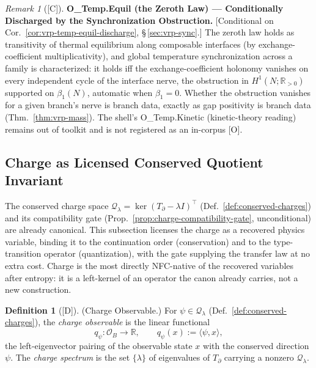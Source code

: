 \documentclass[12pt,oneside]{amsbook}
\theoremstyle{plain}
\theoremstyle{definition}
\newtheorem{definition}[theorem]{Definition}
\theoremstyle{remark}
\newtheorem{remark}[theorem]{Remark}
\newcommand{\status}[1]{\textup{[#1]}}
\begin{document}
\begin{remark}[\status{C}]\label{ob:vrp-temp-equil}
\textbf{O\_Temp.Equil (the Zeroth Law) --- Conditionally
Discharged by the Synchronization Obstruction.}
\textup{[Conditional on Cor.~\ref{cor:vrp-temp-equil-discharge},
\S\,\ref{sec:vrp-sync}.]}
The zeroth law holds as transitivity of thermal equilibrium along
composable interfaces (by exchange-coefficient multiplicativity),
and global temperature synchronization across a family is
characterized: it holds iff the exchange-coefficient holonomy
vanishes on every independent cycle of the interface nerve, the
obstruction in $H^1(N; \mathbb{R}_{>0})$ supported on
$\beta_1(N)$, automatic when $\beta_1 = 0$.  Whether the
obstruction vanishes for a given branch's nerve is branch data,
exactly as gap positivity is branch data
(Thm.~\ref{thm:vrp-mass}).  The shell's O\_Temp.Kinetic
(kinetic-theory reading) remains out of toolkit and is not
registered as an in-corpus [O].
\end{remark}

\subsection{Charge as Licensed Conserved Quotient Invariant}
\label{sec:vrp-charge}

The conserved charge space $\mathcal{Q}_\lambda = \ker(T_\partial -
\lambda I)^{\!\top}$ (Def.~\ref{def:conserved-charges}) and its
compatibility gate (Prop.~\ref{prop:charge-compatibility-gate},
unconditional) are already canonical.  This subsection licenses the
charge as a recovered physics variable, binding it to the continuation
order (conservation) and to the type-transition operator
(quantization), with the gate supplying the transfer law at no extra
cost.  Charge is the most directly NFC-native of the recovered
variables after entropy: it is a left-kernel of an operator the canon
already carries, not a new construction.

\begin{definition}[\status{D}]\label{def:vrp-charge-observable}
\textup{(Charge Observable.)}
For $\psi \in \mathcal{Q}_\lambda$ (Def.~\ref{def:conserved-charges}),
the \emph{charge observable} is the linear functional
\[
  q_\psi : \mathcal{O}_B \to \mathbb{R}, \qquad
  q_\psi(x) := \langle \psi, x \rangle,
\]
the left-eigenvector pairing of the observable state $x$ with the
conserved direction $\psi$.  The \emph{charge spectrum} is the set
$\{\lambda\}$ of eigenvalues of $T_\partial$ carrying a nonzero
$\mathcal{Q}_\lambda$.
\end{definition}
\end{document}
